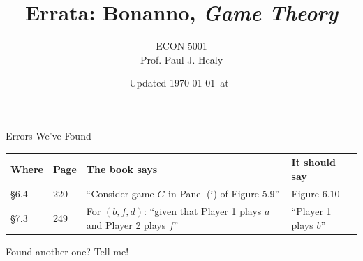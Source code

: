 


\title[Text Errata]{Errata: Bonanno, \textit{Game Theory}}
\author[ECON 5001]{ECON 5001\\Prof. Paul J. Healy} \color{metrop}
\institute[OSU]{}
\date[]{\vfill {\tiny Updated \today\ at\ \DTMcurrenttime}}



\frame{\maketitle}

\begin{frame}{Errors We've Found}
\small
\renewcommand{\arraystretch}{1.5}
\begin{tabular}{@{}l l p{2.4in} p{2.4in}@{}}
\toprule
Where & Page & The book says & It should say \\
\midrule
\S6.4 & 220 & ``Consider game $G$ in Panel (i) of Figure 5.9'' & Figure 6.10 \\
\S7.3 & 249 & For $(b,f,d)$: ``given that Player 1 plays $a$ and Player 2 plays $f$'' & ``Player 1 plays $b$'' \\
\bottomrule
\end{tabular}
\vfill
Found another one? Tell me!
\vspace{-0.3in}
\end{frame}


